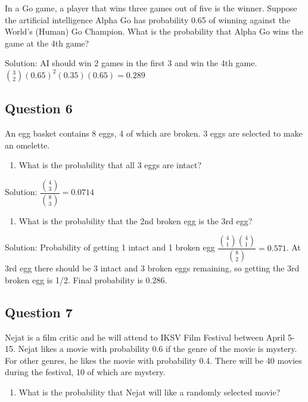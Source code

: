 \documentclass[]{book}
\providecommand{\tightlist}{%
  \setlength{\itemsep}{0pt}\setlength{\parskip}{0pt}}
\theoremstyle{definition}
\theoremstyle{definition}
\theoremstyle{definition}
\theoremstyle{remark}
\begin{document}
In a Go game, a player that wins three games out of five is the winner.
Suppose the artificial intelligence Alpha Go has probability 0.65 of
winning against the World's (Human) Go Champion. What is the probability
that Alpha Go wins the game at the 4th game?

Solution: AI should win 2 games in the first 3 and win the 4th game.
\(\binom{3}{2}(0.65)^2(0.35)(0.65) = 0.289\)

\hypertarget{question-6}{%
\subsection{Question 6}\label{question-6}}

An egg basket contains 8 eggs, 4 of which are broken. 3 eggs are
selected to make an omelette.

\begin{enumerate}
\def\labelenumi{\alph{enumi})}
\tightlist
\item
  What is the probability that all 3 eggs are intact?
\end{enumerate}

Solution: \(\dfrac{\binom{4}{3}}{\binom{8}{3}} = 0.0714\)

\begin{enumerate}
\def\labelenumi{\alph{enumi})}
\setcounter{enumi}{1}
\tightlist
\item
  What is the probability that the 2nd broken egg is the 3rd egg?
\end{enumerate}

Solution: Probability of getting 1 intact and 1 broken egg
\(\dfrac{\binom{4}{1}\binom{4}{1}}{\binom{8}{2}} = 0.571\). At 3rd egg
there should be 3 intact and 3 broken eggs remaining, so getting the 3rd
broken egg is 1/2. Final probability is \(0.286\).

\hypertarget{question-7}{%
\subsection{Question 7}\label{question-7}}

Nejat is a film critic and he will attend to IKSV Film Festival between
April 5-15. Nejat likes a movie with probability 0.6 if the genre of the
movie is mystery. For other genres, he likes the movie with probability
0.4. There will be 40 movies during the festival, 10 of which are
mystery.

\begin{enumerate}
\def\labelenumi{\alph{enumi})}
\tightlist
\item
  What is the probability that Nejat will like a randomly selected
  movie?
\end{enumerate}
\end{document}

